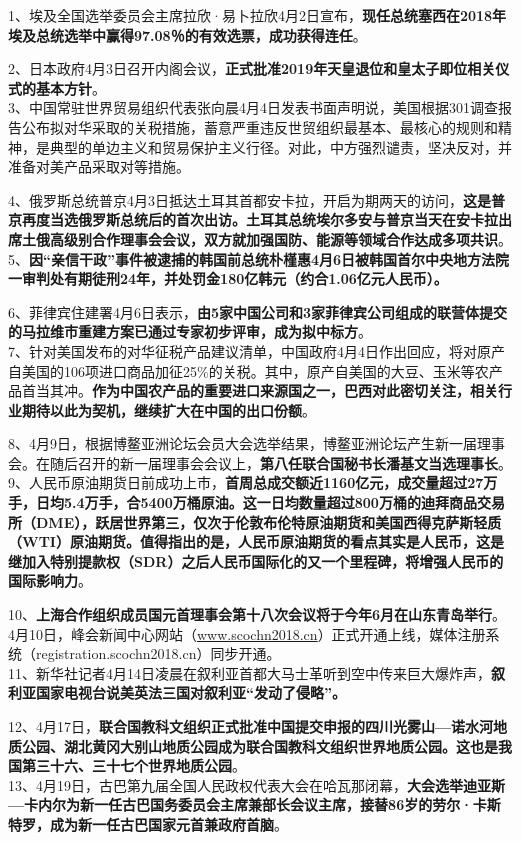 1、埃及全国选举委员会主席拉欣·易卜拉欣4月2日宣布，{\textbf{现任总统塞西在2018年埃及总统选举中赢得97.08％的有效选票，成功获得连任}}。

2、日本政府4月3日召开内阁会议，{\textbf{正式批准2019年天皇退位和皇太子即位相关仪式的基本方针}}。\\
3、中国常驻世界贸易组织代表张向晨4月4日发表书面声明说，美国根据301调查报告公布拟对华采取的关税措施，蓄意严重违反世贸组织最基本、最核心的规则和精神，是典型的单边主义和贸易保护主义行径。对此，中方强烈谴责，坚决反对，并准备对美产品采取对等措施。

4、俄罗斯总统普京4月3日抵达土耳其首都安卡拉，开启为期两天的访问，{\textbf{这是普京再度当选俄罗斯总统后的首次出访。土耳其总统埃尔多安与普京当天在安卡拉出席土俄高级别合作理事会会议，双方就加强国防、能源等领域合作达成多项共识}}。\\
5、{\textbf{因``亲信干政''事件被逮捕的韩国前总统朴槿惠4月6日被韩国首尔中央地方法院一审判处有期徒刑24年，并处罚金180亿韩元（约合1.06亿元人民币）。}}

6、菲律宾住建署4月6日表示，{\textbf{由5家中国公司和3家菲律宾公司组成的联营体提交的马拉维市重建方案已通过专家初步评审，成为拟中标方}}。\\
7、针对美国发布的对华征税产品建议清单，中国政府4月4日作出回应，将对原产自美国的106项进口商品加征25\%的关税。其中，原产自美国的大豆、玉米等农产品首当其冲。{\textbf{作为中国农产品的重要进口来源国之一，巴西对此密切关注，相关行业期待以此为契机，继续扩大在中国的出口份额}}。

8、4月9日，根据博鳌亚洲论坛会员大会选举结果，博鳌亚洲论坛产生新一届理事会。在随后召开的新一届理事会会议上，{\textbf{第八任联合国秘书长潘基文当选理事长}}。\\
9、人民币原油期货日前成功上市，{\textbf{首周总成交额近1160亿元，成交量超过27万手，日均5.4万手，合5400万桶原油。这一日均数量超过800万桶的迪拜商品交易所（DME），跃居世界第三，仅次于伦敦布伦特原油期货和美国西得克萨斯轻质（WTI）原油期货。值得指出的是，人民币原油期货的看点其实是人民币，这是继加入特别提款权（SDR）之后人民币国际化的又一个里程碑，将增强人民币的国际影响力}}。

10、{\textbf{上海合作组织成员国元首理事会第十八次会议将于今年6月在山东青岛举行}}。4月10日，峰会新闻中心网站（\href{http://www.scochn2018.cn/}{www.scochn2018.cn}）正式开通上线，媒体注册系统（registration.scochn2018.cn）同步开通。\\
11、新华社记者4月14日凌晨在叙利亚首都大马士革听到空中传来巨大爆炸声，{\textbf{叙利亚国家电视台说美英法三国对叙利亚``发动了侵略''。}}

12、4月17日，{\textbf{联合国教科文组织正式批准中国提交申报的四川光雾山---诺水河地质公园、湖北黄冈大别山地质公园成为联合国教科文组织世界地质公园。这也是我国第三十六、三十七个世界地质公园}}。\\
13、4月19日，古巴第九届全国人民政权代表大会在哈瓦那闭幕，{\textbf{大会选举迪亚斯---卡内尔为新一任古巴国务委员会主席兼部长会议主席，接替86岁的劳尔·卡斯特罗，成为新一任古巴国家元首兼政府首脑}}。

